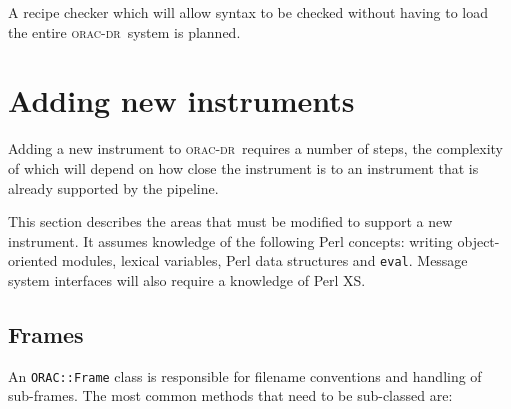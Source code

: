 \documentclass[twoside,11pt]{article}
\renewcommand{\_}{\texttt{\symbol{95}}}
\newcommand{\Oracdr}{\textsc{orac-dr}}
\begin{document}
A recipe checker which will allow syntax to be checked
without having to load the entire \Oracdr\ system is planned.

\section{Adding new instruments}

Adding a new instrument to \Oracdr\ requires a number of steps, the
complexity of which will depend on how close the instrument is to an
instrument that is already supported by the pipeline.

This section describes the areas that must be modified to support a
new instrument. It assumes knowledge of the following Perl concepts:
writing object-oriented modules, lexical variables, Perl data
structures and \texttt{eval}. Message system interfaces will also
require a knowledge of Perl XS.


\subsection{Frames}

An \texttt{ORAC::Frame} class is responsible for filename conventions
and handling of sub-frames. The most common methods that need to be
sub-classed are:
\end{document}
